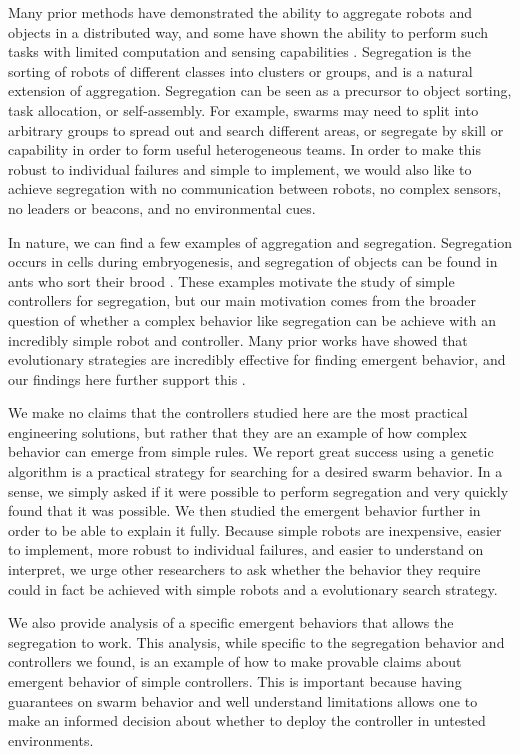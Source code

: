 \documentclass[conference]{IEEEtran}
\begin{document}
  Many prior methods have demonstrated the ability to aggregate robots and objects in a distributed way, and some have shown the ability to perform such tasks with limited computation and sensing capabilities \cite{gauci_self-organized_2014}\cite{shlyakhov_survey_2017}. Segregation is the sorting of robots of different classes into clusters or groups, and is a natural extension of aggregation. Segregation can be seen as a precursor to object sorting, task allocation, or self-assembly. For example, swarms may need to split into arbitrary groups to spread out and search different areas, or segregate by skill or capability in order to form useful heterogeneous teams. In order to make this robust to individual failures and simple to implement, we would also like to achieve segregation with no communication between robots, no complex sensors, no leaders or beacons, and no environmental cues.

  In nature, we can find a few examples of aggregation and segregation. Segregation occurs in cells during embryogenesis, and segregation of objects can be found in ants who sort their brood \cite{santos_segregation_2014}. These examples motivate the study of simple controllers for segregation, but our main motivation comes from the broader question of whether a complex behavior like segregation can be achieve with an incredibly simple robot and controller. Many prior works have showed that evolutionary strategies are incredibly effective for finding emergent behavior, and our findings here further support this \cite{bahgeci_evolving_2005}\cite{johnson_evolving_2016}\cite{dorigo_evolving_2004}.

    We make no claims that the controllers studied here are the most practical engineering solutions, but rather that they are an example of how complex behavior can emerge from simple rules. We report great success using a genetic algorithm is a practical strategy for searching for a desired swarm behavior. In a sense, we simply asked if it were possible to perform segregation and very quickly found that it was possible. We then studied the emergent behavior further in order to be able to explain it fully. Because simple robots are inexpensive, easier to implement, more robust to individual failures, and easier to understand on interpret, we urge other researchers to ask whether the behavior they require could in fact be achieved with simple robots and a evolutionary search strategy.

    We also provide analysis of a specific emergent behaviors that allows the segregation to work. This analysis, while specific to the segregation behavior and controllers we found, is an example of how to make provable claims about emergent behavior of simple controllers. This is important because having guarantees on swarm behavior and well understand limitations allows one to make an informed decision about whether to deploy the controller in untested environments.
\end{document}
